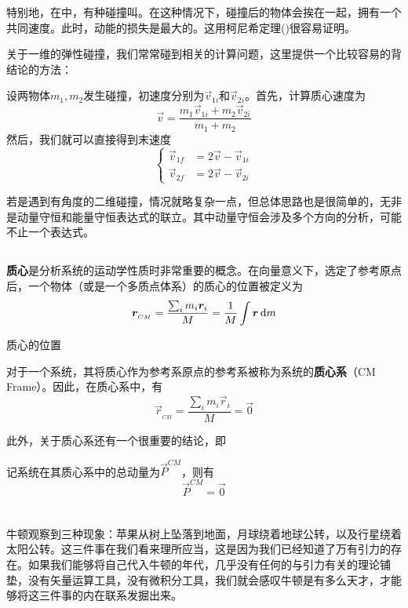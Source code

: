 特别地，在中，有种碰撞叫。在这种情况下，碰撞后的物体会挨在一起，拥有一个共同速度。此时，动能的损失是最大的。这用柯尼希定理()很容易证明。

关于一维的弹性碰撞，我们常常碰到相关的计算问题，这里提供一个比较容易的背结论的方法：

设两物体$m_{1},m_{2}$发生碰撞，初速度分别为$\vec{v}_{1i}$和$\vec{v}_{2i}$。首先，计算质心速度为
\[\vec{v}=\frac{m_{1}\vec{v}_{1i}+m_{2}\vec{v}_{2i}}{m_{1}+m_{2}}\]
然后，我们就可以直接得到末速度
\[\left\{\begin{aligned}
        \vec{v}_{1f} & =2\vec{v}-\vec{v}_{1i} \\
        \vec{v}_{2f} & =2\vec{v}-\vec{v}_{2i}
    \end{aligned}\right.\]

若是遇到有角度的二维碰撞，情况就略复杂一点，但总体思路也是很简单的，无非是动量守恒和能量守恒表达式的联立。其中动量守恒会涉及多个方向的分析，可能不止一个表达式。

\subsection[质心系中的碰撞]{}
\textbf{质心}是分析系统的运动学性质时非常重要的概念。在向量意义下，选定了参考原点后，一个物体（或是一个多质点体系）的质心的位置被定义为
\[\vec{r}_{_{CM}}=\frac{\sum_{i}^{}m_{i}\vec{r}_{i}}{M}=\frac{1}{M}\int \vec{r}\dif m\]

\begin{center}
    质心的位置
\end{center}

对于一个系统，其将质心作为参考系原点的参考系被称为系统的\textbf{质心系}（CM Frame）。因此，在质心系中，有
\[\vec{r}_{_{CM}}=\frac{\sum_{i}^{}m_{i}\vec{r}_{i}}{M}=\vec{0}\]

此外，关于质心系还有一个很重要的结论，即
\begin{law}
    记系统在其质心系中的总动量为$\vec{P}^{CM}$，则有
    \[\vec{P}^{CM}=\vec{0}\]
\end{law}

\section[重力]{}
\subsection[牛顿万有引力定律]{}
牛顿观察到三种现象：苹果从树上坠落到地面，月球绕着地球公转，以及行星绕着太阳公转。这三件事在我们看来理所应当，这是因为我们已经知道了万有引力的存在。如果我们能够将自己代入牛顿的年代，几乎没有任何的与引力有关的理论铺垫，没有矢量运算工具，没有微积分工具，我们就会感叹牛顿是有多么天才，才能够将这三件事的内在联系发掘出来。


